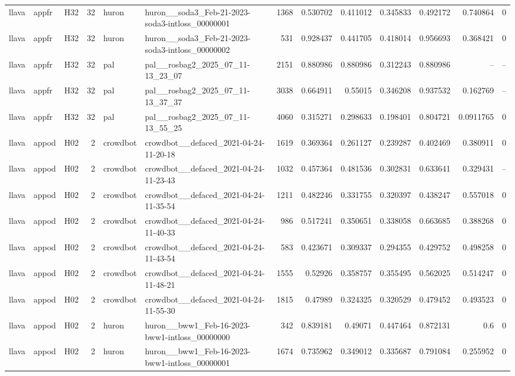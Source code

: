 \begin{longtable}{lllrllrrrrrrr}
llava & appfr & H32 & 32 & huron & huron\_\_soda3\_Feb-21-2023-soda3-intloss\_00000001 & 1368 & 0.530702 & 0.411012 & 0.345833 & 0.492172 & 0.740864 & 0 \\
llava & appfr & H32 & 32 & huron & huron\_\_soda3\_Feb-21-2023-soda3-intloss\_00000002 & 531 & 0.928437 & 0.441705 & 0.418014 & 0.956693 & 0.368421 & 0 \\
llava & appfr & H32 & 32 & pal & pal\_\_rosbag2\_2025\_07\_11-13\_23\_07 & 2151 & 0.880986 & 0.880986 & 0.312243 & 0.880986 & -- & -- \\
llava & appfr & H32 & 32 & pal & pal\_\_rosbag2\_2025\_07\_11-13\_37\_37 & 3038 & 0.664911 & 0.55015 & 0.346208 & 0.937532 & 0.162769 & -- \\
llava & appfr & H32 & 32 & pal & pal\_\_rosbag2\_2025\_07\_11-13\_55\_25 & 4060 & 0.315271 & 0.298633 & 0.198401 & 0.804721 & 0.0911765 & 0 \\
llava & appod & H02 & 2 & crowdbot & crowdbot\_\_defaced\_2021-04-24-11-20-18 & 1619 & 0.369364 & 0.261127 & 0.239287 & 0.402469 & 0.380911 & 0 \\
llava & appod & H02 & 2 & crowdbot & crowdbot\_\_defaced\_2021-04-24-11-23-43 & 1032 & 0.457364 & 0.481536 & 0.302831 & 0.633641 & 0.329431 & -- \\
llava & appod & H02 & 2 & crowdbot & crowdbot\_\_defaced\_2021-04-24-11-35-54 & 1211 & 0.482246 & 0.331755 & 0.320397 & 0.438247 & 0.557018 & 0 \\
llava & appod & H02 & 2 & crowdbot & crowdbot\_\_defaced\_2021-04-24-11-40-33 & 986 & 0.517241 & 0.350651 & 0.338058 & 0.663685 & 0.388268 & 0 \\
llava & appod & H02 & 2 & crowdbot & crowdbot\_\_defaced\_2021-04-24-11-43-54 & 583 & 0.423671 & 0.309337 & 0.294355 & 0.429752 & 0.498258 & 0 \\
llava & appod & H02 & 2 & crowdbot & crowdbot\_\_defaced\_2021-04-24-11-48-21 & 1555 & 0.52926 & 0.358757 & 0.355495 & 0.562025 & 0.514247 & 0 \\
llava & appod & H02 & 2 & crowdbot & crowdbot\_\_defaced\_2021-04-24-11-55-30 & 1815 & 0.47989 & 0.324325 & 0.320529 & 0.479452 & 0.493523 & 0 \\
llava & appod & H02 & 2 & huron & huron\_\_bww1\_Feb-16-2023-bww1-intloss\_00000000 & 342 & 0.839181 & 0.49071 & 0.447464 & 0.872131 & 0.6 & 0 \\
llava & appod & H02 & 2 & huron & huron\_\_bww1\_Feb-16-2023-bww1-intloss\_00000001 & 1674 & 0.735962 & 0.349012 & 0.335687 & 0.791084 & 0.255952 & 0 \\

\end{longtable}
